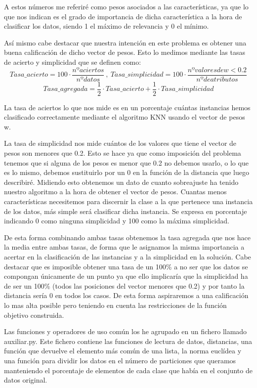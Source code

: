 \documentclass[12pt,a4paper]{article}
\begin{document}
	A estos números me referiré como pesos asociados a las características, ya que lo que nos indican es el grado de importancia de dicha característica a la hora de clasificar los datos, siendo 1 el máximo de relevancia y 0 el mínimo.
	
	Así mismo cabe destacar que nuestra intención en este problema es obtener una buena calificación de dicho vector de pesos. Esto lo medimos mediante las tasas de acierto y simplicidad que se definen como:
	$$Tasa\_acierto = 100\cdot \frac{nº aciertos}{nº datos} \ , \ Tasa\_simplicidad = 100\cdot \frac{nº valores de w < 0.2}{nº de atributos}$$
	$$Tasa\_agregada = \frac{1}{2}\cdot Tasa\_acierto + \frac{1}{2}\cdot Tasa\_simplicidad$$
	
	La tasa de aciertos lo que nos mide es en un porcentaje cuántas instancias hemos clasificado correctamente mediante el algoritmo KNN usando el vector de pesos w.
	
	La tasa de simplicidad nos mide cuántos de los valores que tiene el vector de pesos son menores que 0.2. Esto se hace ya que como imposición del problema tenemos que si alguna de los pesos es menor que 0.2 no debemos usarlo, o lo que es lo mismo, debemos sustituirlo por un 0 en la función de la distancia que luego describiré. Midiendo esto obtenemos un dato de cuanto sobreajuste ha tenido nuestro algoritmo a la hora de obtener el vector de pesos. Cuantas menos características necesitemos para discernir la clase a la que pertenece una instancia de los datos, más simple será clasificar dicha instancia. Se expresa en porcentaje indicando 0 como ninguna simplicidad y 100 como la máxima simplicidad.
	
	De esta forma combinando ambas tasas obtenemos la tasa agregada que nos hace la media entre ambas tasas, de forma que le asignamos la misma importancia a acertar en la clasificación de las instancias y a la simplicidad en la solución. Cabe destacar que es imposible obtener una tasa de un 100\% a no ser que los datos se compongan únicamente de un punto ya que ello implicaría que la simplicidad ha de ser un 100\% (todos las posiciones del vector menores que 0.2) y por tanto la distancia sería 0 en todos los casos. De esta forma aspiraremos a una calificación lo mas alta posible pero teniendo en cuenta las restricciones de la función objetivo construida.
	
	Las funciones y operadores de uso común los he agrupado en un fichero llamado auxiliar.py. Este fichero contiene las funciones de lectura de datos, distancias, una función que devuelve el elemento más común de una lista, la norma euclídea y una función para dividir los datos en el número de particiones que queramos manteniendo el porcentaje de elementos de cada clase que había en el conjunto de datos original.
	
\end{document}
